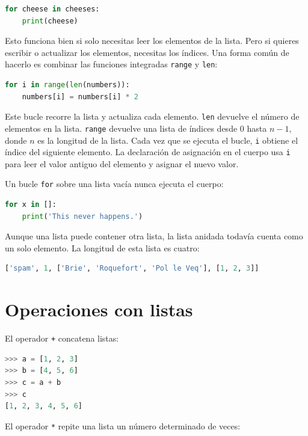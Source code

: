 \begin{lstlisting}[language=Python]
for cheese in cheeses:
    print(cheese)
\end{lstlisting}

Esto funciona bien si solo necesitas leer los elementos de la lista. Pero si quieres escribir o actualizar los elementos, necesitas los índices. Una forma común de hacerlo es combinar las funciones integradas \texttt{range} y \texttt{len}:

\begin{lstlisting}[language=Python]
for i in range(len(numbers)):
    numbers[i] = numbers[i] * 2
\end{lstlisting}

Este bucle recorre la lista y actualiza cada elemento. \texttt{len} devuelve el número de elementos en la lista. \texttt{range} devuelve una lista de índices desde 0 hasta \(n-1\), donde \(n\) es la longitud de la lista. Cada vez que se ejecuta el bucle, \texttt{i} obtiene el índice del siguiente elemento. La declaración de asignación en el cuerpo usa \texttt{i} para leer el valor antiguo del elemento y asignar el nuevo valor.

Un bucle \texttt{for} sobre una lista vacía nunca ejecuta el cuerpo:

\begin{lstlisting}[language=Python]
for x in []:
    print('This never happens.')
\end{lstlisting}

Aunque una lista puede contener otra lista, la lista anidada todavía cuenta como un solo elemento. La longitud de esta lista es cuatro:

\begin{lstlisting}[language=Python]
['spam', 1, ['Brie', 'Roquefort', 'Pol le Veq'], [1, 2, 3]]
\end{lstlisting}

\section{Operaciones con listas}

El operador \texttt{+} concatena listas:

\begin{lstlisting}[language=Python]
>>> a = [1, 2, 3] 
>>> b = [4, 5, 6] 
>>> c = a + b 
>>> c 
[1, 2, 3, 4, 5, 6]
\end{lstlisting}

El operador \texttt{*} repite una lista un número determinado de veces:

